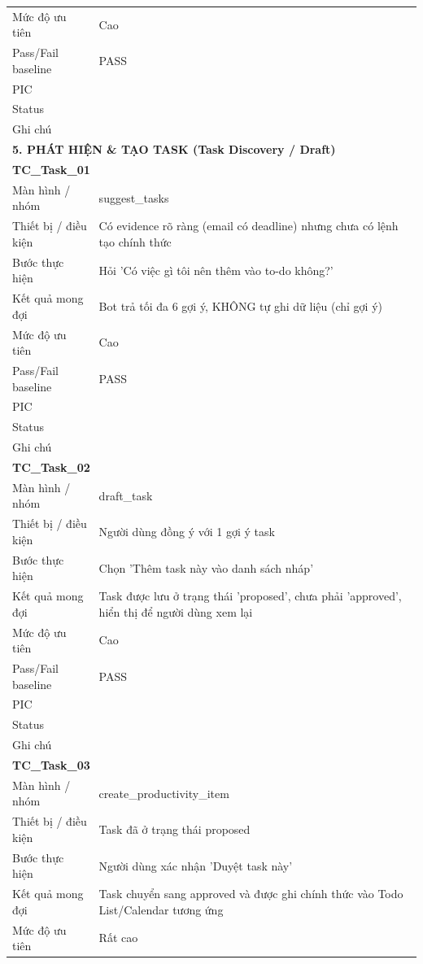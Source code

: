 \documentclass[12pt,a4paper]{article}
\begin{document}
\begin{longtable}{p{3.0cm}p{11.5cm}}
Mức độ ưu tiên & Cao \\
Pass/Fail baseline & PASS \\
PIC &  \\
Status &  \\
Ghi chú &  \\
\midrule
\multicolumn{2}{l}{\textbf{5. PHÁT HIỆN \& TẠO TASK (Task Discovery / Draft)}} \\ \midrule
\multicolumn{2}{l}{\textbf{TC\_Task\_01}} \\
Màn hình / nhóm & suggest\_tasks \\
Thiết bị / điều kiện & Có evidence rõ ràng (email có deadline) nhưng chưa có lệnh tạo chính thức \\
Bước thực hiện & Hỏi 'Có việc gì tôi nên thêm vào to-do không?' \\
Kết quả mong đợi & Bot trả tối đa 6 gợi ý, KHÔNG tự ghi dữ liệu (chỉ gợi ý) \\
Mức độ ưu tiên & Cao \\
Pass/Fail baseline & PASS \\
PIC &  \\
Status &  \\
Ghi chú &  \\
\midrule
\multicolumn{2}{l}{\textbf{TC\_Task\_02}} \\
Màn hình / nhóm & draft\_task \\
Thiết bị / điều kiện & Người dùng đồng ý với 1 gợi ý task \\
Bước thực hiện & Chọn 'Thêm task này vào danh sách nháp' \\
Kết quả mong đợi & Task được lưu ở trạng thái 'proposed', chưa phải 'approved', hiển thị để người dùng xem lại \\
Mức độ ưu tiên & Cao \\
Pass/Fail baseline & PASS \\
PIC &  \\
Status &  \\
Ghi chú &  \\
\midrule
\multicolumn{2}{l}{\textbf{TC\_Task\_03}} \\
Màn hình / nhóm & create\_productivity\_item \\
Thiết bị / điều kiện & Task đã ở trạng thái proposed \\
Bước thực hiện & Người dùng xác nhận 'Duyệt task này' \\
Kết quả mong đợi & Task chuyển sang approved và được ghi chính thức vào Todo List/Calendar tương ứng \\
Mức độ ưu tiên & Rất cao \\

\end{longtable}
\end{document}
